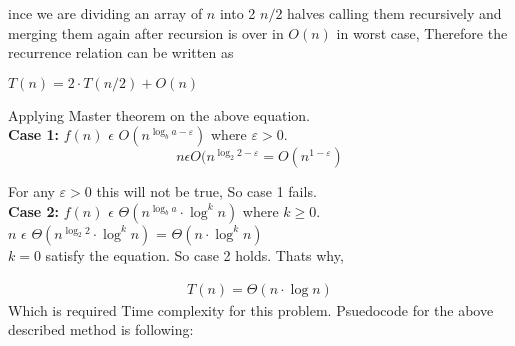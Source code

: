 \documentclass[a4paper,11pt]{article}
\theoremstyle{quest}
\newenvironment{solution}[2][Solution]{\begin{trivlist}
		\item[\hskip \labelsep {\bfseries #1}\hskip \labelsep {\bfseries #2.}]}{\end{trivlist}}
\begin{document}
\begin{solution}
	Since we are dividing an array of $n$ into 2 $n/2$ halves calling them recursively and merging them again after recursion is over in $O(n)$ in worst case, Therefore the recurrence relation can be written as
	\begin{center}
		$T(n) = 2 \cdot T(n/2) + O(n)$ \\
	\end{center}
	Applying Master theorem on the above equation.\\
	
	\textbf{Case 1:} $f(n)$ $\epsilon$ $O(n^{\log_b{a} - \varepsilon})$ where $\varepsilon > 0$.\\
	\begin{equation*}
	n \epsilon O(n^{\log_2{2} - \varepsilon} = O(n^{1 - \varepsilon})
	\end{equation*}
	
	For any $\varepsilon > 0$ this will not be true, So case 1 fails.\\
	
	\textbf{Case 2:} $f(n)$ $\epsilon$ $\Theta(n^{\log_b{a}}\cdot \log^k n)$ where $k \ge 0$.\\
	
	$n$ $\epsilon$ $\Theta(n^{\log_2{2}}\cdot \log^k n)$ = $\Theta(n\cdot \log^k n)$\\
	
	$k = 0$ satisfy the equation. So case 2 holds. Thats why,

	\begin{align*}
	\boxed{T(n) = \Theta(n\cdot \log{n})}
	\end{align*}
	Which is required Time complexity for this problem.
	\newpage
	Psuedocode for the above described method is following:
	
	\begin{algorithm}[!h]
		\begin{algorithmic}
			
			\EndIf
			
			 \\
			
			
			 
			
			 \\
			

\end{algorithmic}
\end{algorithm}
\end{solution}
\end{document}
